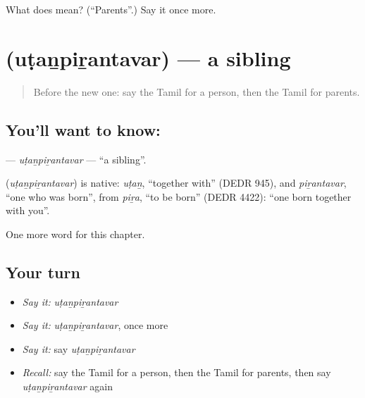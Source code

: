\begin{tcolorbox}[breakable,colback=teal!4,colframe=teal!35!black,title={Before you move on}]
What does  mean? (\textquotedblleft{}Parents\textquotedblright{}.) Say it once more.
\end{tcolorbox}
\section[\texorpdfstring{\ta{உடன்பிறந்தவர்} (uṭaṉpiṟantavar)}{உடன்பிறந்தவர் (uṭaṉpiṟantavar)}]{ (uṭaṉpiṟantavar) — a sibling}

\label{lesson:TA-C273-utanpirantavar}



\begin{quote}
Before the new one: say the Tamil for a person, then the Tamil for parents.
\end{quote}

\subsection*{You'll want to know: }
\textbf{} — \emph{uṭaṉpiṟantavar} — \textquotedblleft{}a sibling\textquotedblright{}.

\begin{cousinweb}
\textbf{} (\emph{uṭaṉpiṟantavar}) is native: \emph{uṭaṉ}, \textquotedblleft{}together with\textquotedblright{} (DEDR 945), and \emph{piṟantavar}, \textquotedblleft{}one who was born\textquotedblright{}, from \emph{piṟa}, \textquotedblleft{}to be born\textquotedblright{} (DEDR 4422): \textquotedblleft{}one born together with you\textquotedblright{}.
\end{cousinweb}

\begin{grammarlens}[title={What you've built}]
One more word for this chapter.
\end{grammarlens}

\subsection*{Your turn}
\begin{itemize}
\raggedright
  \item \emph{Say it:} \emph{uṭaṉpiṟantavar}
  \item \emph{Say it:} \emph{uṭaṉpiṟantavar}, once more
  \item \emph{Say it:} say \emph{uṭaṉpiṟantavar}
  \item \emph{Recall:} say the Tamil for a person, then the Tamil for parents, then say \emph{uṭaṉpiṟantavar} again
\end{itemize}

